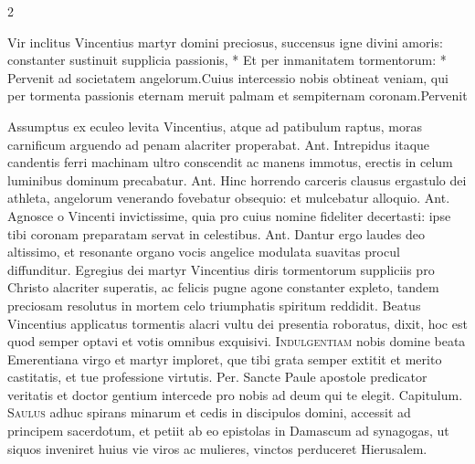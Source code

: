 \begin{multicols*}{2}
\begin{responsory-final}
{Vir inclitus Vincentius martyr domini preciosus, succensus igne divini amoris: constanter sustinuit supplicia passionis, * Et per inmanitatem tormentorum: * Pervenit ad societatem angelorum.}{Cuius intercessio nobis obtineat veniam, qui per tormenta passionis eternam meruit palmam et sempiternam coronam.}{Pervenit}
\end{responsory-final}%
 Assumptus ex eculeo levita Vincentius, atque ad patibulum raptus, moras carnificum arguendo ad penam alacriter properabat. {\color{Red} Ant.} Intrepidus itaque candentis ferri machinam ultro conscendit ac manens immotus, erectis in celum luminibus dominum precabatur. {\color{Red} Ant.} Hinc horrendo carceris clausus ergastulo dei athleta, angelorum venerando fovebatur obsequio: et mulcebatur alloquio. {\color{Red} Ant.} Agnosce o Vincenti invictissime, quia pro cuius nomine fideliter decertasti: ipse tibi coronam preparatam servat in celestibus. %
{\color{Red} Ant.} Dantur ergo laudes deo altissimo, et resonante organo vocis angelice modulata suavitas procul diffunditur.
 Egregius dei martyr Vincentius diris tormentorum suppliciis pro Christo alacriter superatis, ac felicis pugne agone constanter expleto, tandem preciosam resolutus in mortem celo triumphatis spiritum reddidit.
 Beatus Vincentius applicatus tormentis alacri vultu dei presentia roboratus, dixit, hoc est quod semper optavi et votis omnibus exquisivi.
{\color{Red} }
\lettrine[lines=2]{\zallmancaps \color{Red} I}{ndulgentiam} nobis domine beata Emerentiana virgo et martyr imploret, que tibi grata semper extitit et merito castitatis, et tue professione virtutis. Per.
{\color{Red} }
 Sancte Paule apostole predicator veritatis et doctor gentium intercede pro nobis ad deum qui te elegit. {\color{Red} Capitulum.}
\lettrine[lines=2]{\zallmancaps \color{Blue} S}{aulus} adhuc spirans minarum et cedis in discipulos domini, accessit ad principem sacerdotum, et petiit ab eo epistolas in Damascum ad synagogas, ut siquos inveniret huius vie viros ac mulieres, vinctos perduceret Hierusalem.

\end{multicols*}

